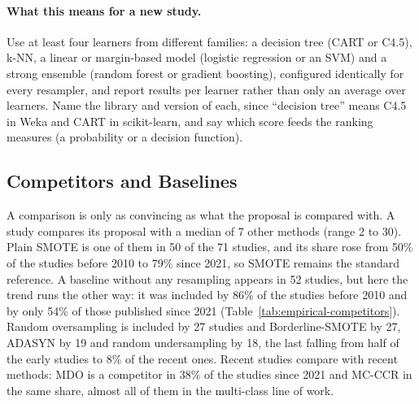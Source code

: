 \paragraph{What this means for a new study.} Use at least four learners from different families: a decision tree (CART or C4.5), k-NN, a linear or margin-based model (logistic regression or an SVM) and a strong ensemble (random forest or gradient boosting), configured identically for every resampler, and report results per learner rather than only an average over learners. Name the library and version of each, since ``decision tree'' means C4.5 in Weka and CART in scikit-learn, and say which score feeds the ranking measures (a probability or a decision function).

\subsection{Competitors and Baselines}
\label{sec:empirical-baselines}

A comparison is only as convincing as what the proposal is compared with. A study compares its proposal with a median of 7 other methods (range 2 to 30). Plain SMOTE is one of them in 50 of the 71 studies, and its share rose from 50\% of the studies before 2010 to 79\% since 2021, so SMOTE remains the standard reference. A baseline without any resampling appears in 52 studies, but here the trend runs the other way: it was included by 86\% of the studies before 2010 and by only 54\% of those published since 2021 (Table~\ref{tab:empirical-competitors}). Random oversampling is included by 27 studies and Borderline-SMOTE by 27, ADASYN by 19 and random undersampling by 18, the last falling from half of the early studies to 8\% of the recent ones. Recent studies compare with recent methods: MDO is a competitor in 38\% of the studies since 2021 and MC-CCR in the same share, almost all of them in the multi-class line of work.



